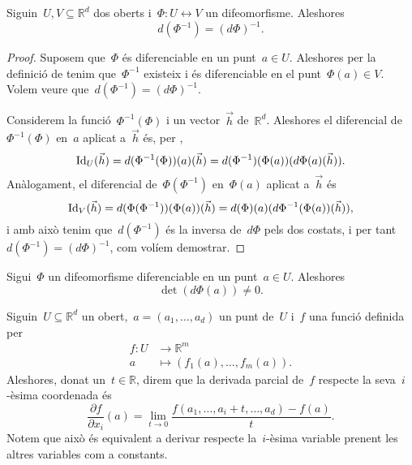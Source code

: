 \documentclass[../../main.tex]{subfiles}
\begin{document}
    \begin{proposition}\label{prop:difeomorfisme diferenciable invertible}
        Siguin~\(U,V\subseteq\mathbb{R}^{d}\) dos oberts i~\(\Phi\colon U\longleftrightarrow V\) un difeomorfisme.
        Aleshores
        \[
            d(\Phi^{-1})=(d\Phi)^{-1}.
        \]
        \begin{proof}
            Suposem que~\(\Phi\) és diferenciable en un punt~\(a\in U\).
            Aleshores per la definició de  tenim que~\(\Phi^{-1}\) existeix i és diferenciable en el punt~\(\Phi(a)\in V\).
            Volem veure que~\(d(\Phi^{-1})=(d\Phi)^{-1}\).

            Considerem la funció~\(\Phi^{-1}(\Phi)\) i un vector~\(\vec{h}\) de~\(\mathbb{R}^{d}\).
            Aleshores el diferencial de~\(\Phi^{-1}(\Phi)\) en~\(a\) aplicat a~\(\vec{h}\) és, per ,
            \[
                \operatorname{Id}_{U}(\vec{h})=d(\Phi^{-1}(\Phi))(a)(\vec{h})=d(\Phi^{-1})(\Phi(a))(d\Phi(a)(\vec{h})).
            \]
            Anàlogament, el diferencial de~\(\Phi(\Phi^{-1})\) en~\(\Phi(a)\) aplicat a~\(\vec{h}\) és
            \[
                \operatorname{Id}_{V}(\vec{h})=d(\Phi(\Phi^{-1}))(\Phi(a))(\vec{h})=d(\Phi)(a)(d\Phi^{-1}(\Phi(a))(\vec{h})),
            \]
            i amb això tenim que~\(d(\Phi^{-1})\) és la inversa de~\(d\Phi\) pels dos costats, i per tant~\(d(\Phi^{-1})=(d\Phi)^{-1}\), com volíem demostrar.
        \end{proof} %
    \end{proposition}
    \begin{corollary}\label{corollary:difeomorfime determinant}
        Sigui~\(\Phi\) un difeomorfisme diferenciable en un punt~\(a\in U\).
        Aleshores
        \[
            \det(d\Phi(a))\neq0.
        \]
    \end{corollary}
    \begin{definition}
        \label{def:Derivades parcials}
        Siguin~\(U\subseteq\mathbb{R}^{d}\) un obert,~\(a=(a_{1},\dots,a_{d})\) un punt de~\(U\) i~\(f\) una funció definida per
        \begin{align*}
        f\colon U&\longrightarrow\mathbb{R}^{m}\\
        a&\longmapsto(f_{1}(a),\dots,f_{m}(a)).
        \end{align*}
        Aleshores, donat un~\(t\in\mathbb{R}\), direm que la derivada parcial de~\(f\) respecte la seva~\(i\)-èsima coordenada és
        \[
            \frac{\partial f}{\partial x_{i}}(a)=\lim_{t\to0}\frac{f(a_{1},\dots,a_{i}+t,\dots,a_{d})-f(a)}{t}.
        \]
        Notem que això és equivalent a derivar respecte la~\(i\)-èsima variable prenent les altres variables com a constants.
    \end{definition}
\end{document}
